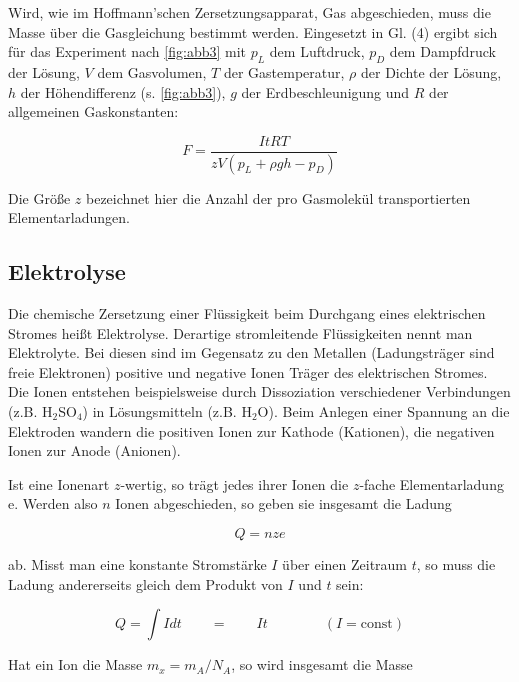 \documentclass[11pt,ngerman]{scrartcl}
\begin{document}
Wird, wie im Hoffmann'schen Zersetzungsapparat, Gas abgeschieden, muss die Masse über die
Gasgleichung bestimmt werden. Eingesetzt in Gl. (4) ergibt sich für das Experiment nach \autoref{fig:abb3}
mit $p_L$ dem Luftdruck, $p_D$ dem Dampfdruck der Lösung, $V$ dem Gasvolumen, $T$ der Gastemperatur,
$\rho$ der Dichte der Lösung, $h$ der Höhendifferenz (s. \autoref{fig:abb3}), $g$ der Erdbeschleunigung und
$R$ der allgemeinen Gaskonstanten:

\begin{equation}
	F = \frac{I t R T}{z V (p_L + \rho g h - p_D)}
	\label{eq:Faraday_elektro}
\end{equation}

Die Größe $z$ bezeichnet hier die Anzahl der pro Gasmolekül transportierten Elementarladungen.



\subsection{Elektrolyse}

Die chemische Zersetzung einer Flüssigkeit beim Durchgang eines elektrischen Stromes heißt
Elektrolyse. Derartige stromleitende Flüssigkeiten nennt man Elektrolyte. Bei diesen sind im
Gegensatz zu den Metallen (Ladungsträger sind freie Elektronen) positive und negative Ionen
Träger des elektrischen Stromes. Die Ionen entstehen beispielsweise durch Dissoziation verschiedener
Verbindungen (z.B. H$_2$SO$_4$) in Lösungsmitteln (z.B. H$_2$O). Beim Anlegen einer Spannung
an die Elektroden wandern die positiven Ionen zur Kathode (Kationen), die negativen Ionen zur
Anode (Anionen).

Ist eine Ionenart $z$-wertig, so trägt jedes ihrer Ionen die $z$-fache Elementarladung e. Werden also
$n$ Ionen abgeschieden, so geben sie insgesamt die Ladung

\begin{equation}
	Q = n z e
\end{equation}

ab. Misst man eine konstante Stromstärke $I$ über einen Zeitraum $t$, so muss die Ladung andererseits
gleich dem Produkt von $I$ und $t$ sein:

\begin{equation}
	Q = \int I dt \qquad = \qquad I t \qquad \qquad (I = \textrm{const})
\end{equation}

Hat ein Ion die Masse $m_x = m_A / N_A$, so wird insgesamt die Masse
\end{document}
